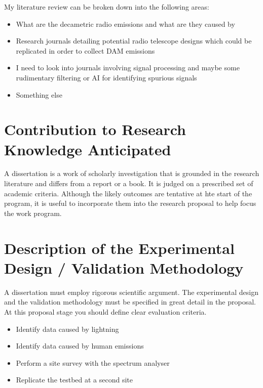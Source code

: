 \documentclass[runningheads,a4paper]{llncs}
\begin{document}
My literature review can be broken down into the following areas:

\begin{itemize}
  \item What are the decametric radio emissions and what are they caused by
  \item Research journals detailing potential radio telescope designs which could be replicated in order to collect DAM emissions
  \item I need to look into journals involving signal processing and maybe some rudimentary filtering or AI for identifying spurious signals
  \item Something else
  
\end{itemize}
%
%
\newpage
\section*{Contribution to Research Knowledge Anticipated}
%
A dissertation is a work of scholarly investigation that is grounded in the research literature and differs from a report or a book. It is judged on a prescribed set of academic criteria. Although the likely outcomes are tentative at hte start of the program, it is useful to incorporate them into the research proposal to help focus the work program.
%
%
\newpage
\section*{Description of the Experimental Design / Validation Methodology}
%
A dissertation must employ rigorous scientific argument. The experimental design and the validation methodology must be specified in great detail in the proposal. At this proposal stage you should define clear evaluation criteria.


\begin{itemize}
  \item Identify data caused by lightning
  \item Identify data caused by human emissions
  \item Perform a site survey with the spectrum analyser
  \item Replicate the testbed at a second site
\end{itemize}
%
%
\newpage
\end{document}
